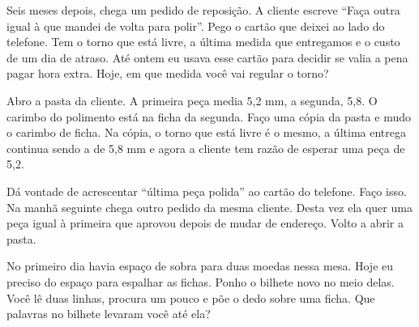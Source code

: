 Seis meses depois, chega um pedido de reposição. A cliente escreve “Faça outra igual à que mandei de volta para polir”. Pego o cartão que deixei ao lado do telefone. Tem o torno que está livre, a última medida que entregamos e o custo de um dia de atraso. Até ontem eu usava esse cartão para decidir se valia a pena pagar hora extra. Hoje, em que medida você vai regular o torno?

Abro a pasta da cliente. A primeira peça media 5,2 mm, a segunda, 5,8. O carimbo do polimento está na ficha da segunda. Faço uma cópia da pasta e mudo o carimbo de ficha. Na cópia, o torno que está livre é o mesmo, a última entrega continua sendo a de 5,8 mm e agora a cliente tem razão de esperar uma peça de 5,2.

Dá vontade de acrescentar “última peça polida” ao cartão do telefone. Faço isso. Na manhã seguinte chega outro pedido da mesma cliente. Desta vez ela quer uma peça igual à primeira que aprovou depois de mudar de endereço. Volto a abrir a pasta.

No primeiro dia havia espaço de sobra para duas moedas nessa mesa. Hoje eu preciso do espaço para espalhar as fichas. Ponho o bilhete novo no meio delas. Você lê duas linhas, procura um pouco e põe o dedo sobre uma ficha. Que palavras no bilhete levaram você até ela?
